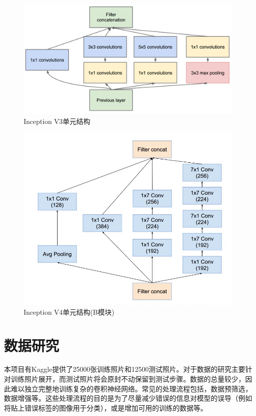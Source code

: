 \documentclass[a4paper,11pt]{article}
\begin{document}
 \begin{figure}[htb]
\centering
\includegraphics[scale=0.2]{./figure/inception_v3.png}
\caption{Inception V3单元结构}
\label{fig:inceptionV3}
\end{figure}

 \begin{figure}[htb]
\centering
\includegraphics[scale=0.4]{./figure/inception_v4.jpg}
\caption{Inception V4单元结构(B模块)}
\label{fig:inceptionV4}
\end{figure}


\section{数据研究}
\label{sec:org210ab0e}
本项目有Kaggle提供了25000张训练照片和12500测试照片。对于数据的研究主要针对训练照片展开，而测试照片将会原封不动保留到测试步骤。数据的总量较少，因此难以独立完整地训练复杂的卷积神经网络。常见的处理流程包括，数据预筛选，数据增强等。这些处理流程的目的是为了尽量减少错误的信息对模型的误导（例如将贴上错误标签的图像用于分类），或是增加可用的训练的数据等。
\end{document}
